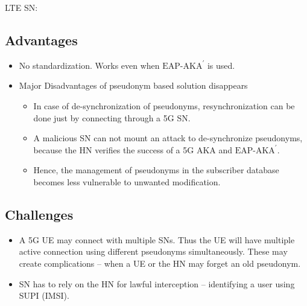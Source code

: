 \documentclass[portrait,a0]{a0poster}
\begin{document}
\begin{multicols}{2}
\vspace{.5cm}
{\Large{}\textcolor{facultyColor}{\MakeUppercase{LTE SN:}} \MakeUppercase{}}\\


\begin{center}
    
\end{center}

\subsection*{Advantages}
\begin{itemize}
 \item No standardization. Works even when $\text{EAP-AKA}^{'}$ is used.
 \item Major Disadvantages of pseudonym based solution disappears 
  \begin{itemize}
   \item In case of de-synchronization of pseudonyms, resynchronization can be done just by connecting through a 5G SN.
   \item A malicious SN can not mount an attack to de-synchronize pseudonyms, because the HN verifies the success of a 5G AKA and $\text{EAP-AKA}^{'}$.
   \item Hence, the management of pseudonyms in the subscriber database becomes less vulnerable to unwanted modification.
  \end{itemize}
\end{itemize}

\subsection*{Challenges}
\begin{itemize}
 \item A 5G UE may connect with multiple SNs. Thus the UE will have multiple active connection using different pseudonyms simultaneously. These may create complications -- when a UE or the HN may forget an old pseudonym.
 \item SN has to rely on the HN for lawful interception -- identifying a user using SUPI (IMSI). 
\end{itemize}


%
%

\end{multicols}

\vfill %

\begin{minipage}[t]{0.9\linewidth} %
\footnotesize
\end{minipage}
\end{document}
